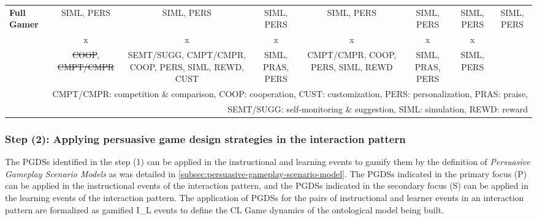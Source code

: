 \begin{landscape}
\begin{tabular}{|l|c|c|c|c|c|c|c|}
\multirow{3}{*}{\textbf{Full Gamer}}& 
\multicolumn{1}{|p{2.5cm}|}{\centering SIML, PERS}&%
\multicolumn{1}{|p{2.5cm}|}{\centering SIML, PERS}&%
\multicolumn{1}{|p{2.5cm}|}{\centering SIML, PERS}&%
\multicolumn{1}{|p{2.5cm}|}{\centering SIML, PERS}&%
\multicolumn{1}{|p{2.5cm}|}{\centering SIML, PERS}&%
\multicolumn{1}{|p{2.5cm}|}{\centering SIML, PERS}&%
\multicolumn{1}{|p{2.5cm}|}{\centering SIML, PERS}\tabularnewline
& 
\multicolumn{1}{|p{2.5cm}|}{\centering x}&
\multicolumn{1}{|p{2.5cm}|}{\centering x}&
\multicolumn{1}{|p{2.5cm}|}{\centering x}&
\multicolumn{1}{|p{2.5cm}|}{\centering x}&
\multicolumn{1}{|p{2.5cm}|}{\centering x}&
\multicolumn{1}{|p{2.5cm}|}{\centering x}&
\tabularnewline
& 
\multicolumn{1}{|p{2.5cm}|}{\centering \st{COOP}, \st{CMPT/CMPR}}&%
\multicolumn{1}{|p{2.5cm}|}{\centering \mbox{SEMT/SUGG}, \mbox{CMPT/CMPR}, COOP, PERS, SIML, REWD, CUST}&%
\multicolumn{1}{|p{2.5cm}|}{\centering SIML, PRAS, PERS}&%
\multicolumn{1}{|p{2.5cm}|}{\centering CMPT/CMPR, COOP, PERS, SIML, REWD}&%
\multicolumn{1}{|p{2.5cm}|}{\centering SIML, PRAS, PERS}&%
\multicolumn{1}{|p{2.5cm}|}{\centering SIML, PERS}&%
\tabularnewline
\hline
\multicolumn{8}{r}{CMPT/CMPR: competition \& comparison, COOP: cooperation, CUST: customization, PERS: personalization, PRAS: praise,}\tabularnewline
\multicolumn{8}{r}{SEMT/SUGG: self-monitoring \& suggestion, SIML: simulation, REWD: reward}
\end{tabular}


\end{landscape}

\subsubsection*{Step (2): Applying persuasive game design strategies in the interaction pattern}

The PGDSs identified in the step (1) can be applied in the instructional and learning events to gamify them by the definition of \emph{Persuasive Gameplay Scenario Models} as was detailed in \autoref{subsec:persuasive-gameplay-scenario-model}. The PGDSs indicated in the primary focus (P) can be applied in the instructional events of the interaction pattern, and the PGDSs indicated in the secondary focus (S) can be applied in the learning events of the interaction pattern. The application of PGDSs for the pairs of instructional and learner events in an interaction pattern are formalized as gamified I\_L events to define the CL Game dynamics of the ontological model being built.

